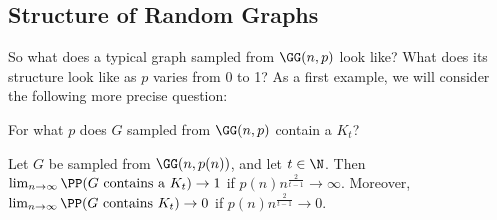 \subsection{Structure of Random Graphs}

So what does a typical graph sampled from $\GG(n, p)$ look like? What does its structure look like as $p$ varies from 0 to 1? As a first example, we will consider the following more precise question:

\begin{center}
	For what $p$ does $G$ sampled from $\GG(n, p)$ contain a $K_t$?
\end{center}

\begin{theorem}
	Let $G$ be sampled from $\GG(n, p(n))$, and let $t \in \N$. Then
	$\lim_{n \to \infty} \PP(G \text{ contains a $K_t$}) \rightarrow 1$ if $p(n)n^{\frac{2}{t - 1}} \rightarrow \infty$.
	Moreover, $\lim_{n \to \infty} \PP(\text{$G$ contains $K_t$}) \rightarrow 0$ if $p(n) n^{\frac{2}{t - 1}} \rightarrow 0$.
\end{theorem}
